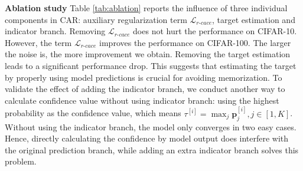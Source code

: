 \documentclass{article}
\begin{document}
\textbf{Ablation study} Table \ref{tab:ablation} reports the influence of three individual components in CAR: auxiliary regularization term $\mathcal{L}_{r\textrm{-}cace}$, target estimation and indicator branch. Removing $\mathcal{L}_{r\textrm{-}cace}$ does not hurt the performance on CIFAR-10. However, the term $\mathcal{L}_{r\textrm{-}cace}$ improves the performance on CIFAR-100. The larger the noise is, the more improvement we obtain. Removing the target estimation leads to a significant performance drop. This suggests that estimating the target by properly using model predictions is crucial for avoiding memorization. To validate the effect of adding the indicator branch, we conduct another way to calculate confidence value without using indicator branch: using the highest probability as the confidence value, which means $\tau^{[i]} = \max_{j} \bm{p}^{[i]}_{j}, j\in[1,K]$. Without using the indicator branch, the model only converges in two easy cases. Hence, directly calculating the confidence by model output does interfere with the original prediction branch, while adding an extra indicator branch solves this problem. 
\end{document}
